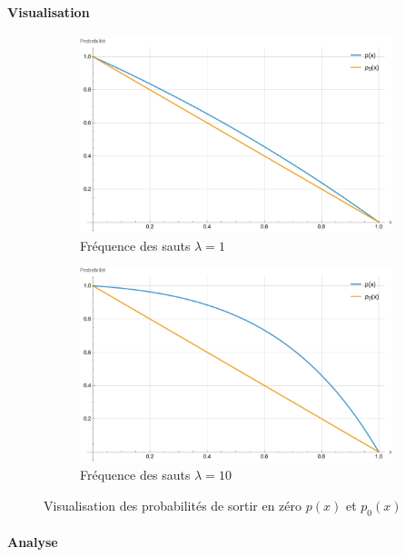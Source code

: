 \paragraph{Visualisation}\phantom{}
\begin{figure}[htb]
    \centering
    \begin{subfigure}{0.49\linewidth}
        \includegraphics[width=\linewidth]{img/validation/Jumps/probability_jumps.pdf}
        \caption{Fréquence des sauts $\lambda=1$}
    \end{subfigure}
    \hfill
    \begin{subfigure}{0.49\linewidth}
        \includegraphics[width=\linewidth]{img/validation/Jumps/probability_big_jumps.pdf}
        \caption{Fréquence des sauts $\lambda=10$}
    \end{subfigure}
    \caption{Visualisation des probabilités de sortir en zéro $p(x)$ et $p_0(x)$}\label{fig:JumpsProbabilityVisualisation}
\end{figure}
\FloatBarrier\paragraph{Analyse}\mbox{}\\
